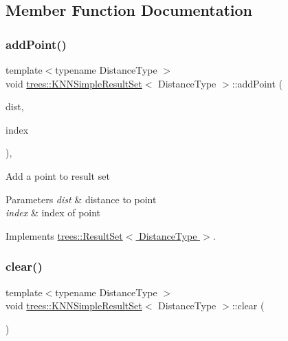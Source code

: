 \subsection{Member Function Documentation}
\mbox{\label{classtrees_1_1_k_n_n_simple_result_set_a834254eb4a4e1f4e0046376f9d60719d}} 
\subsubsection{\texorpdfstring{add\+Point()}{addPoint()}}
{\footnotesize\ttfamily template$<$typename Distance\+Type $>$ \\
void \hyperlink{classtrees_1_1_k_n_n_simple_result_set}{trees\+::\+K\+N\+N\+Simple\+Result\+Set}$<$ Distance\+Type $>$\+::add\+Point (\begin{DoxyParamCaption}\item[{Distance\+Type}]{dist,  }\item[{size\+\_\+t}]{index }\end{DoxyParamCaption})\hspace{0.3cm}{\ttfamily [inline]}, {\ttfamily [virtual]}}

Add a point to result set 
\begin{DoxyParams}{Parameters}
{\em dist} & distance to point \\
\hline
{\em index} & index of point \\
\hline
\end{DoxyParams}


Implements \hyperlink{classtrees_1_1_result_set}{trees\+::\+Result\+Set$<$ Distance\+Type $>$}.

\mbox{\label{classtrees_1_1_k_n_n_simple_result_set_a123d8cf8956641841e3b73904414e0b4}} 
\subsubsection{\texorpdfstring{clear()}{clear()}}
{\footnotesize\ttfamily template$<$typename Distance\+Type $>$ \\
void \hyperlink{classtrees_1_1_k_n_n_simple_result_set}{trees\+::\+K\+N\+N\+Simple\+Result\+Set}$<$ Distance\+Type $>$\+::clear (\begin{DoxyParamCaption}{ }\end{DoxyParamCaption})\hspace{0.3cm}{\ttfamily [inline]}}


